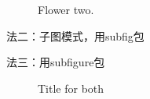 \documentclass{article}
\begin{document}
\begin{CJK}{UTF8}{gbsn}
\begin{figure}[!tbp]
\begin{minipage}[b]{0.4\textwidth}
		\label{fig:label2}
		\caption{Flower two.}
	\end{minipage}
\end{figure}
	


法二：子图模式，用subfig包

法三：用subfigure包
\begin{figure}
	\hfill
	\hfill
	\hfill
	\caption{Title for both}
\end{figure}




\end{CJK}
\end{document}
